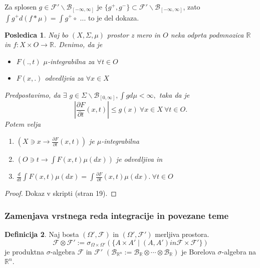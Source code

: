 \documentclass[a4paper,12pt]{article}
\theoremstyle{definition} %
\newtheorem{definicija}{Definicija}[section]
\theoremstyle{plain} %
\newtheorem{posledica}[definicija]{Posledica}
\newcommand{\R}{\mathbb{R}}
\newcommand{\F}{\mathcal{F}}
\begin{document}
            Za splosen $g \in \F'\backslash\mathcal{B}_{[-\infty, \infty]}$ je $\{g^+, g^-\} \subset \F'\backslash\mathcal{B}_{[-\infty, \infty]}$,
            zato $\int g^+d(f* \mu) = \int g^+ \circ $ ... to je del dokaza.

            \begin{posledica}
                Naj bo $(X, \Sigma, \mu)$ prostor z mero in $O$ neka odprta podmnozica $\R$ in $f:X \times O \rightarrow \R$. Denimo, da je 
                \begin{itemize}
                    \item $F(., t)$ $\mu$-integrabilna za $\forall t \in O$
                    \item $F(x, .)$ odvedljvia za $\forall x \in X$ 
                \end{itemize}
                Predpostavimo, da $\exists$ $g \in \Sigma\backslash\mathcal{B}_{[0, \infty]}, \int g d\mu < \infty,$ taka da je 
                $$
                    \left|\frac{\partial F}{\partial t}(x, t) \right| \leq g(x) \ \forall x \in X \ \forall t \in O.
                $$
                Potem velja 
                \begin{enumerate}
                    \item $(X \ni x \rightarrow \frac{\partial F}{\partial t}(x, t))$ je $\mu$-integrabilna
                    \item $(O \ni t \rightarrow \int F(x,t)\mu(dx))$ je odvedljiva in 
                    \item $\frac{d}{dt}\int F(x, t)\mu(dx) = \int \frac{\partial F}{\partial t}(x, t)\mu(dx). \ \forall t \in O$
                \end{enumerate}
            \end{posledica}

            \begin{proof}
                Dokaz v skripti (stran 19).
            \end{proof}

        \subsubsection{Zamenjava vrstnega reda integracije in povezane teme}
            
            \begin{definicija}
                Naj bosta $(\Omega', \F)$ in $(\Omega', \F')$ merljiva prostora. 
                $$
                    \F \otimes \F' := \sigma_{\Omega \times \Omega'}(\{A \times A' \mid (A, A') in \F \times \F'\})
                $$
                je produktna $\sigma$-algebra $\F$ in $\F'$ $(\mathcal{B}_{\R^n} := \mathcal{B}_{\R} \otimes \cdots \otimes \mathcal{B}_{\R})$ je Borelova
                $\sigma$-algebra na $\R^n$.
            \end{definicija}
\end{document}

